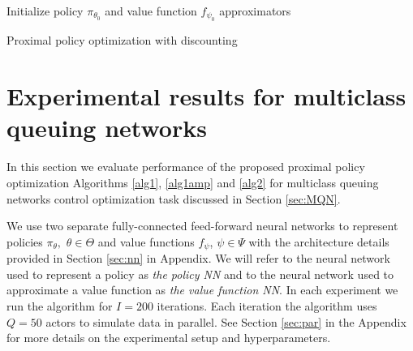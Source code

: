 \documentclass[11pt]{article}
\theoremstyle{definition}
\numberwithin{equation}{section}
\begin{document}
\begin{algorithm}[H]
\SetAlgoLined
{}
 Initialize  policy $\pi_{\theta_0}$ and value function $f_{\psi_0}$ approximators \;
 \caption{Proximal policy optimization with discounting}\label{alg2}
\end{algorithm}




\section{Experimental results for multiclass queuing networks}\label{sec:experiments}
In this section we evaluate performance of the proposed proximal policy optimization Algorithms \ref{alg1},  \ref{alg1amp} and \ref{alg2} for multiclass queuing networks control optimization task discussed in Section \ref{sec:MQN}. 
 

 

We use two separate fully-connected feed-forward neural networks to represent  policies $\pi_\theta,$ $\theta\in \Theta$ and value functions $f_\psi$, $\psi\in \Psi$ with the architecture details provided in Section \ref{sec:nn} in Appendix.  We will refer to the neural network used to represent a policy as \textit{the  policy NN} and to  the neural network used to approximate a value function as \textit{the value function NN}. In each experiment we run the algorithm for $I=200$ iterations. Each iteration the algorithm uses $Q=50$ actors to simulate data in parallel.    See Section \ref{sec:par} in the
Appendix for more details on the experimental setup and hyperparameters. 
\end{document}
